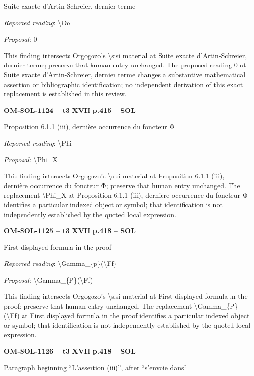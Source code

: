 Suite exacte d'Artin-Schreier, dernier terme\par
\emph{Reported reading}: \textbackslash{}Oo\par
\emph{Proposal}: 0\par
This finding intersects Orgogozo's \textbackslash{}sisi material at Suite exacte d'Artin-Schreier, dernier terme; preserve that human entry unchanged. The proposed reading 0 at Suite exacte d'Artin-Schreier, dernier terme changes a substantive mathematical assertion or bibliographic identification; no independent derivation of this exact replacement is established in this review.\par
\par\noindent\textbf{OM-SOL-1124 -- t3 XVII p.415 -- SOL}\par
Proposition 6.1.1 (iii), dernière occurrence du foncteur Φ\par
\emph{Reported reading}: \textbackslash{}Phi\par
\emph{Proposal}: \textbackslash{}Phi\_X\par
This finding intersects Orgogozo's \textbackslash{}sisi material at Proposition 6.1.1 (iii), dernière occurrence du foncteur Φ; preserve that human entry unchanged. The replacement \textbackslash{}Phi\_X at Proposition 6.1.1 (iii), dernière occurrence du foncteur Φ identifies a particular indexed object or symbol; that identification is not independently established by the quoted local expression.\par
\par\noindent\textbf{OM-SOL-1125 -- t3 XVII p.418 -- SOL}\par
First displayed formula in the proof\par
\emph{Reported reading}: \textbackslash{}Gamma\_\{p\}(\textbackslash{}Ff)\par
\emph{Proposal}: \textbackslash{}Gamma\_\{P\}(\textbackslash{}Ff)\par
This finding intersects Orgogozo's \textbackslash{}sisi material at First displayed formula in the proof; preserve that human entry unchanged. The replacement \textbackslash{}Gamma\_\{P\}(\textbackslash{}Ff) at First displayed formula in the proof identifies a particular indexed object or symbol; that identification is not independently established by the quoted local expression.\par
\par\noindent\textbf{OM-SOL-1126 -- t3 XVII p.418 -- SOL}\par
Paragraph beginning “L'assertion (iii)”, after “s'envoie dans”\par
